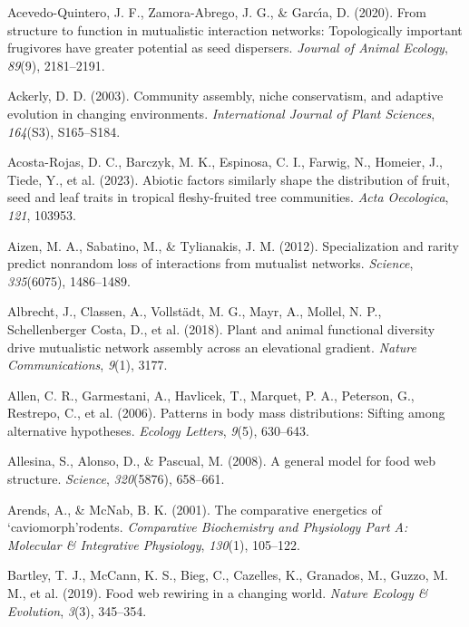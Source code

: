\documentclass[
]{agujournal2019}
\newlength{\cslhangindent}
\newenvironment{CSLReferences}[2] %
 {\begin{list}{}{%
  \setlength{\itemindent}{0pt}
  \setlength{\leftmargin}{0pt}
  \setlength{\parsep}{0pt}
  \ifodd #1
   \setlength{\leftmargin}{\cslhangindent}
   \setlength{\itemindent}{-1\cslhangindent}
  \fi
  \setlength{\itemsep}{#2\baselineskip}}}
 {\end{list}}
\begin{document}
\label{refs}
\begin{CSLReferences}{1}{0}
Acevedo-Quintero, J. F., Zamora-Abrego, J. G., \& Garcı́a, D. (2020).
From structure to function in mutualistic interaction networks:
Topologically important frugivores have greater potential as seed
dispersers. \emph{Journal of Animal Ecology}, \emph{89}(9), 2181--2191.

Ackerly, D. D. (2003). Community assembly, niche conservatism, and
adaptive evolution in changing environments. \emph{International Journal
of Plant Sciences}, \emph{164}(S3), S165--S184.

Acosta-Rojas, D. C., Barczyk, M. K., Espinosa, C. I., Farwig, N.,
Homeier, J., Tiede, Y., et al. (2023). Abiotic factors similarly shape
the distribution of fruit, seed and leaf traits in tropical
fleshy-fruited tree communities. \emph{Acta Oecologica}, \emph{121},
103953.

Aizen, M. A., Sabatino, M., \& Tylianakis, J. M. (2012). Specialization
and rarity predict nonrandom loss of interactions from mutualist
networks. \emph{Science}, \emph{335}(6075), 1486--1489.

Albrecht, J., Classen, A., Vollstädt, M. G., Mayr, A., Mollel, N. P.,
Schellenberger Costa, D., et al. (2018). Plant and animal functional
diversity drive mutualistic network assembly across an elevational
gradient. \emph{Nature Communications}, \emph{9}(1), 3177.

Allen, C. R., Garmestani, A., Havlicek, T., Marquet, P. A., Peterson,
G., Restrepo, C., et al. (2006). Patterns in body mass distributions:
Sifting among alternative hypotheses. \emph{Ecology Letters},
\emph{9}(5), 630--643.

Allesina, S., Alonso, D., \& Pascual, M. (2008). A general model for
food web structure. \emph{Science}, \emph{320}(5876), 658--661.

Arends, A., \& McNab, B. K. (2001). The comparative energetics of
`caviomorph'rodents. \emph{Comparative Biochemistry and Physiology Part
A: Molecular \& Integrative Physiology}, \emph{130}(1), 105--122.

Bartley, T. J., McCann, K. S., Bieg, C., Cazelles, K., Granados, M.,
Guzzo, M. M., et al. (2019). Food web rewiring in a changing world.
\emph{Nature Ecology \& Evolution}, \emph{3}(3), 345--354.


\end{CSLReferences}
\end{document}
